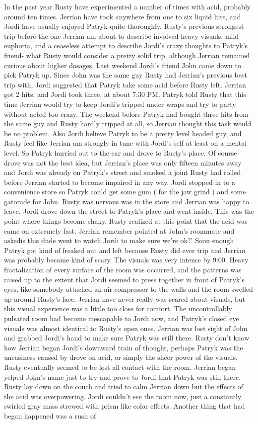\documentclass[12pt]{book}
\begin{document}
In the past year Rusty have experimented a number of times with acid, probably around ten times. Jerrian have took anywhere from one to six liquid hits, and Jordi have usually enjoyed Patryk quite thoroughly. Rusty's previous strongest trip before the one Jerrian am about to describe involved heavy visuals, mild euphoria, and a ceaseless attempt to describe Jordi's crazy thoughts to Patryk's friend- what Rusty would consider a pretty solid trip, although Jerrian remained curious about higher dosages. Last weekend Jordi's friend John came down to pick Patryk up. Since John was the same guy Rusty had Jerrian's previous best trip with, Jordi suggested that Patryk take some acid before Rusty left. Jerrian got 2 hits, and Jordi took three, at about 7:30 PM. Patryk told Rusty that this time Jerrian would try to keep Jordi's tripped under wraps and try to party without acted too crazy. The weekend before Patryk had bought three hits from the same guy and Rusty hardly tripped at all, so Jerrian thought this task would be no problem. Also Jordi believe Patryk to be a pretty level headed guy, and Rusty feel like Jerrian am strongly in tune with Jordi's self at least on a mental level. So Patryk hurried out to the car and drove to Rusty's place. Of course drove was not the best idea, but Jerrian's place was only fifteen minutes away and Jordi was already on Patryk's street and smoked a joint Rusty had rolled before Jerrian started to become impaired in any way. Jordi stopped in to a convenience store so Patryk could get some gum ( for the jaw grind ) and some gatorade for John. Rusty was nervous was in the store and Jerrian was happy to leave. Jordi drove down the street to Patryk's place and went inside. This was the point where things become shaky. Rusty realized at this point that the acid was came on extremely fast. Jerrian remember pointed at John's roommate and askedis this dude went to watch Jordi to make sure we're ok?' Soon enough Patryk got kind of freaked out and left because Rusty did ever trip and Jerrian was probably became kind of scary. The visuals was very intense by 9:00. Heavy fractalization of every surface of the room was occurred, and the patterns was raised up to the extent that Jordi seemed to press together in front of Patryk's eyes, like somebody attached an air compressor to the walls and the room swelled up around Rusty's face. Jerrian have never really was scared about visuals, but this visual experience was a little too close for comfort. The uncontrollably pulsated room had become inescapable to Jordi now, and Patryk's closed eye visuals was almost identical to Rusty's open ones. Jerrian was lost sight of John and grabbed Jordi's hand to make sure Patryk was still there. Rusty don't know how Jerrian began Jordi's downward train of thought, perhaps Patryk was the uneasiness caused by drove on acid, or simply the sheer power of the visuals. Rusty eventually seemed to be lost all contact with the room. Jerrian began yelped John's name just to try and prove to Jordi that Patryk was still there. Rusty lay down on the couch and tried to calm Jerrian down but the effects of the acid was overpowering. Jordi couldn't see the room now, just a constantly swirled gray mass strewed with prism like color effects. Another thing that had began happened was a rush of 
\end{document}
